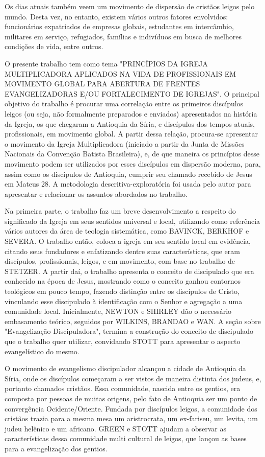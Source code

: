 \documentclass[12pt,openright,oneside,a4paper]{abntex2}
\begin{document}
Os dias atuais também veem um movimento de dispersão de cristãos leigos pelo mundo. Desta vez, no entanto, existem vários outros fatores envolvidos:  funcionários expatriados de empresas globais, estudantes em intercâmbio, militares em serviço, refugiados, famílias e indivíduos em busca de melhores condições de vida, entre outros. 

O presente trabalho tem como tema "PRINCÍPIOS DA IGREJA MULTIPLICADORA APLICADOS NA VIDA DE PROFISSIONAIS EM MOVIMENTO GLOBAL PARA ABERTURA DE FRENTES EVANGELIZADORAS E/OU FORTALECIMENTO DE IGREJAS". O principal objetivo do trabalho é procurar uma correlação entre os primeiros discípulos leigos (ou seja, não formalmente preparados e enviados) apresentados na história da Igreja, os que chegaram a Antioquia da Síria, e discípulos dos tempos atuais, profissionais, em movimento global. A partir dessa relação, procura-se apresentar o movimento da Igreja Multiplicadora (iniciado a partir da Junta de Missões Nacionais da Convenção Batista Brasileira), e, de que maneira os princípios desse movimento podem ser utilizados por esses discípulos em dispersão moderna, para, assim como os discípulos de Antioquia, cumprir seu chamado recebido de Jesus em Mateus 28. A metodologia descritiva-exploratória foi usada pelo autor para apresentar e relacionar os assuntos abordados no trabalho.

Na primeira parte, o trabalho faz um breve desenvolvimento a respeito do significado da Igreja em seus sentidos universal e local, utilizando como referência vários autores da área de teologia sistemática, como BAVINCK, BERKHOF e SEVERA. O trabalho então, coloca a igreja em seu sentido local em evidência, citando seus fundadores e enfatizando dentre suas características, que eram discípulos, profissionais, leigos, e em movimento, com base no trabalho de STETZER. A partir daí, o trabalho apresenta o conceito de discipulado que era conhecido na época de Jesus, mostrando como o conceito ganhou contornos teológicos em pouco tempo, fazendo distinção entre os discípulos de Cristo, vinculando esse discipulado à identificação com o Senhor e agregação a uma comunidade local. Inicialmente, NEWTON e SHIRLEY dão o necessário embasamento teórico, seguidos por WILKINS, BRANDAO e WAN. A seção sobre "Evangelização Discipuladora", termina a construção do conceito de discipulado que o trabalho quer utilizar, convidando STOTT para apresentar o aspecto evangelístico do mesmo.

O movimento de evangelismo discipulador alcançou a cidade de Antioquia da Síria, onde os discípulos começaram a ser vistos de maneira distinta dos judeus, e, portanto chamados cristãos. Essa comunidade, nascida entre os gentios, era composta por pessoas de muitas origens, pelo fato de Antioquia ser um ponto de convergência Ocidente/Oriente. Fundada por discípulos leigos, a comunidade dos cristãos trazia para a mesma mesa um aristrocrata, um ex-fariseu, um levita, um judeu helênico e um africano. GREEN e STOTT ajudam a observar as características dessa comunidade multi cultural de leigos, que lançou as bases para a evangelização dos gentios. 
\end{document}
